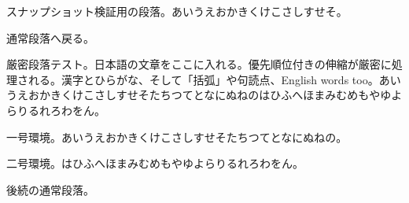 \documentclass[pdflatex]{jlreq}
\begin{document}
\makeatletter
\begingroup
\edef\snaphsize{\the\hsize}%
\edef\snappi{\the\parindent}%
\edef\snapbs{\the\baselineskip}%
\hsize=333pt
\parindent=20pt
\begin{jlreqparagraph}
スナップショット検証用の段落。あいうえおかきくけこさしすせそ。
\end{jlreqparagraph}
\ifdim\jlreqpar@hsize=333pt\relax\else
  \typeout{STRICT-FAIL: hsize-snapshot (\the\jlreqpar@hsize)}\fi
\makeatother
通常段落へ戻る。
\makeatletter
\ifdim\hsize=333pt\else\typeout{STRICT-FAIL: hsize-restored}\fi
\endgroup
\makeatother
\begin{jlreqparagraph}
厳密段落テスト。日本語の文章をここに入れる。優先順位付きの伸縮が厳密に処理される。漢字とひらがな、そして「括弧」や句読点、English words too。あいうえおかきくけこさしすせそたちつてとなにぬねのはひふへほまみむめもやゆよらりるれろわをん。
\end{jlreqparagraph}
\begin{jlreqparagraph}
一号環境。あいうえおかきくけこさしすせそたちつてとなにぬねの。
\end{jlreqparagraph}
\begin{jlreqparagraph}
二号環境。はひふへほまみむめもやゆよらりるれろわをん。
\end{jlreqparagraph}
後続の通常段落。
\makeatletter
{}
\makeatother
\end{document}
